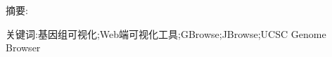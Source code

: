 \chapter*{\LARGE \heiti \cnthtopic}

\vspace{1em}
{\large {\heiti 摘要: }}\normalsize{\songti 

}

{\large {\heiti 关键词:}}\normalsize{基因组可视化;Web端可视化工具;GBrowse;JBrowse;UCSC Genome Browser}
\thispagestyle{empty}
